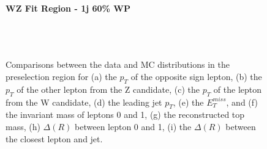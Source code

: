 \begin{figure}[H] 
    \centering
    \textbf{WZ Fit Region - 1j 60\% WP}\\
    \\
    \\
    \\
    \caption{Comparisons between the data and MC distributions in the preselection region for (a) the $p_T$ of the opposite sign lepton, (b) the $p_T$ of the other lepton from the Z candidate, (c) the $p_T$ of the lepton from the W candidate, (d) the leading jet $p_T$, (e) the $E_T^{miss}$, and (f) the invariant mass of leptons 0 and 1, (g) the reconstructed top mass, (h) $\Delta(R)$  between lepton 0 and 1, (i) the $\Delta(R)$ between the closest lepton and jet.}
    \label{kin:WP_1j_60}    
\end{figure}

